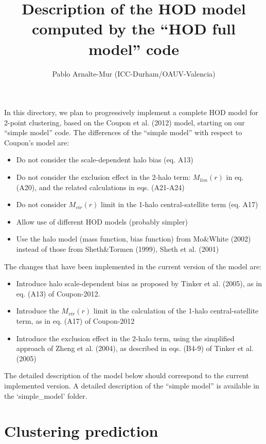 \documentclass[10pt,a4paper]{article}
\title{Description of the HOD model computed by the ``HOD full model'' code}
\author{Pablo Arnalte-Mur (ICC-Durham/OAUV-Valencia)}
\begin{document}
\maketitle

In this directory, we plan to progressively implement a complete HOD model for 2-point clustering, based on the Coupon et al. (2012) model, starting on our ``simple model'' code. 
The differences of the ``simple model'' with respect to Coupon's model are:

\begin{itemize}

\item Do not consider the scale-dependent halo bias (eq. A13)
\item Do not consider the exclusion effect in the 2-halo term: $M_{lim}(r)$ in eq. (A20),
  and the related calculations in eqs. (A21-A24)
\item Do not consider $M_{vir}(r)$ limit in the 1-halo central-satellite term (eq. A17)
\item Allow use of different HOD models (probably simpler)
\item Use the halo model (mass function, bias function) from Mo\&White (2002) instead of those from Sheth\&Tormen (1999), Sheth et al. (2001)
\end{itemize}


The changes that have been implemented in the current version of the model are:
\begin{itemize}
\item Introduce halo scale-dependent bias as proposed by Tinker et al. (2005), as in eq. (A13) of Coupon-2012.
\item Introduce the $M_{vir}(r)$ limit in the calculation of the 1-halo central-satellite term, as in eq. (A17) of Coupon-2012
\item Introduce the exclusion effect in the 2-halo term, using the simplified approach of Zheng et al. (2004), as described in eqs. (B4-9) of Tinker et al. (2005)
\end{itemize}


The detailed description of the model below should correspond to the current implemented version. 
A detailed description of the ``simple model'' is available in the `simple\_model' folder.

\section{Clustering prediction}
\end{document}
